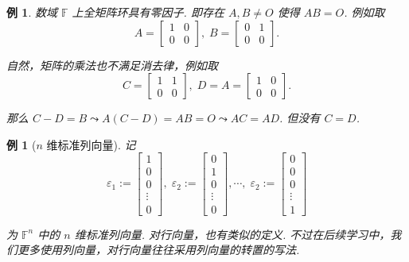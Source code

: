 \documentclass[10pt,openany]{article}
\theoremstyle{thmstyle} %
\theoremstyle{defstyle} %
\theoremstyle{prostyle} %
\theoremstyle{exastyle}
\newtheorem{example}[theorem]{例}
\theoremstyle{remstyle}
\newcommand{\F}{\mathbb{F}}
\begin{document}
\begin{example}
	数域 \( \F \) 上全矩阵环具有零因子. 即存在 \( A, B \neq O \) 使得 \( AB=O \). 例如取
	\[ A=\begin{bmatrix}
		1 & 0 \\ 0 & 0
	\end{bmatrix}, \; B=\begin{bmatrix}
	0 & 1 \\ 0 & 0
	\end{bmatrix}. \]
	
	自然，矩阵的乘法也不满足消去律，例如取
	\[ C=\begin{bmatrix}
		1 & 1 \\ 0 & 0
	\end{bmatrix}, \; D=A=\begin{bmatrix}
	1 & 0 \\ 0 & 0
	\end{bmatrix}. \]
	
	那么 \( C-D=B \leadsto A(C-D)=AB=O \leadsto AC=AD \). 但没有 \( C=D \).
\end{example}
\begin{example}[\( n \) 维标准列向量]
	记
	\[ \varepsilon_1:=\begin{bmatrix}
		1 \\ 0 \\ 0 \\ \vdots \\ 0
	\end{bmatrix}, \; \varepsilon_2:=\begin{bmatrix}
	0 \\ 1 \\ 0 \\ \vdots \\ 0
	\end{bmatrix}, \cdots, \; \varepsilon_2:=\begin{bmatrix}
	0 \\ 0 \\ 0 \\ \vdots \\ 1
	\end{bmatrix} \]
	
	为 \( \F^n \) 中的 \( n \) 维标准列向量. 对行向量，也有类似的定义. 不过在后续学习中，我们更多使用列向量，对行向量往往采用列向量的转置的写法.
\end{example}
\end{document}

